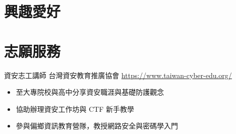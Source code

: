 \documentclass[a4paper, serif, 10pt]{moderncv}
\begin{document}
\section{興趣愛好}

\section{志願服務}

        {資安志工講師}
        {台灣資安教育推廣協會}
        {\url{https://www.taiwan-cyber-edu.org/}}
        {}
        {\begin{itemize}
\item 至大專院校與高中分享資安職涯與基礎防護觀念
\item 協助辦理資安工作坊與 CTF 新手教學
\item 參與偏鄉資訊教育營隊，教授網路安全與密碼學入門
\end{itemize}}
    
\end{document}

